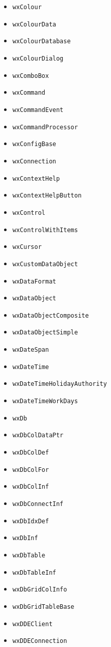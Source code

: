 \documentclass[a4paper,11pt,oneside,titlepage]{report}
\begin{document}
\begin{itemize}
\item \texttt{wxColour}
\item \texttt{wxColourData}
\item \texttt{wxColourDatabase}
\item \texttt{wxColourDialog}
\item \texttt{wxComboBox}
\item \texttt{wxCommand}
\item \texttt{wxCommandEvent}
\item \texttt{wxCommandProcessor}
\item \texttt{wxConfigBase}
\item \texttt{wxConnection}
\item \texttt{wxContextHelp}
\item \texttt{wxContextHelpButton}
\item \texttt{wxControl}
\item \texttt{wxControlWithItems}
\item \texttt{wxCursor}
\item \texttt{wxCustomDataObject}
\item \texttt{wxDataFormat}
\item \texttt{wxDataObject}
\item \texttt{wxDataObjectComposite}
\item \texttt{wxDataObjectSimple}
\item \texttt{wxDateSpan}
\item \texttt{wxDateTime}
\item \texttt{wxDateTimeHolidayAuthority}
\item \texttt{wxDateTimeWorkDays}
\item \texttt{wxDb}
\item \texttt{wxDbColDataPtr}
\item \texttt{wxDbColDef}
\item \texttt{wxDbColFor}
\item \texttt{wxDbColInf}
\item \texttt{wxDbConnectInf}
\item \texttt{wxDbIdxDef}
\item \texttt{wxDbInf}
\item \texttt{wxDbTable}
\item \texttt{wxDbTableInf}
\item \texttt{wxDbGridColInfo}
\item \texttt{wxDbGridTableBase}
\item \texttt{wxDDEClient}
\item \texttt{wxDDEConnection}

\end{itemize}
\end{document}
